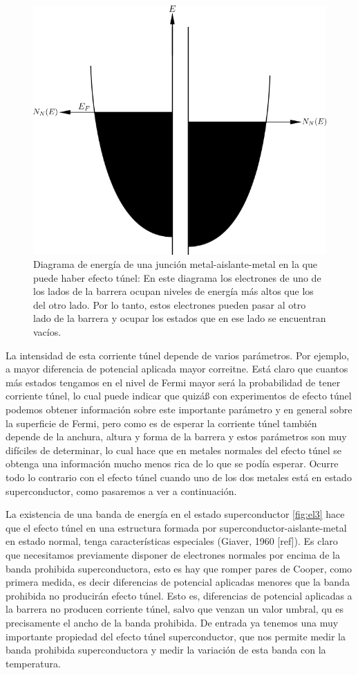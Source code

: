 \begin{figure}[H]
\centering \includegraphics[width=0.8\linewidth]{img/el2.png}
\caption[Diagrama de energía de una junción metal-aislante-metal en la que puede haber efecto túnel]{Diagrama de energía de una junción metal-aislante-metal en la que puede haber efecto túnel: En este diagrama los electrones de uno de los lados de la barrera ocupan niveles de energía más altos que los del otro lado. Por lo tanto, estos electrones pueden pasar al otro lado de la barrera y ocupar los estados que en ese lado se encuentran vacíos.}
\label{fig:el2}
\end{figure}

La intensidad de esta corriente túnel depende de varios parámetros. Por ejemplo, a mayor diferencia de potencial aplicada mayor correitne. Está claro que cuantos más estados tengamos en el nivel de Fermi mayor será la probabilidad de tener corriente túnel, lo cual puede indicar que quizáß con experimentos de efecto túnel podemos obtener información sobre este importante parámetro y en general sobre la superficie de Fermi, pero como es de esperar la corriente túnel también depende de la anchura, altura y forma de la barrera y estos parámetros son muy difíciles de determinar, lo cual hace que en metales normales del efecto túnel se obtenga una información mucho menos rica de lo que se podía esperar. Ocurre todo lo contrario con el efecto túnel cuando uno de los dos metales está en estado superconductor, como pasaremos a ver a continuación.

La existencia de una banda de energía en el estado superconductor \ref{fig:el3} hace que el efecto túnel en una estructura formada por superconductor-aislante-metal en estado normal, tenga características especiales (Giaver, 1960 [ref]). Es claro que necesitamos previamente disponer de electrones normales por encima de la banda prohibida superconductora, esto es hay que romper pares de Cooper, como primera medida, es decir diferencias de potencial aplicadas menores que la banda prohibida no producirán efecto túnel. Esto es, diferencias de potencial aplicadas a la barrera no producen corriente túnel, salvo que venzan un valor umbral, qu es precisamente el ancho de la banda prohibida. De entrada ya tenemos una muy importante propiedad del efecto túnel superconductor, que nos permite medir la banda prohibida superconductora y medir la variación de esta banda con la temperatura.

